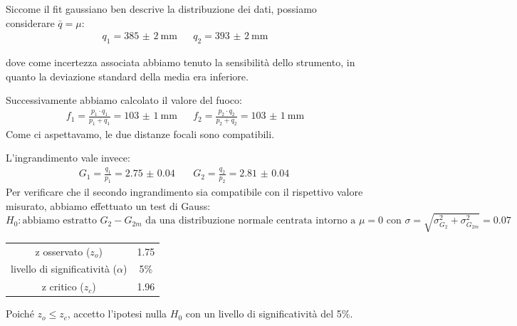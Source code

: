 \documentclass[a4paper]{article}
\begin{document}
    Siccome il fit gaussiano ben descrive la distribuzione dei dati, possiamo considerare $\bar{q} = \mu$:
    \begin{align*}
    	q_1 = \SI{385(2)}{\mm} && q_2 = \SI{393(2)}{\mm}
    \end{align*}
    
    dove come incertezza associata abbiamo tenuto la sensibilità dello strumento, in quanto la deviazione standard della media era inferiore.
    
    Successivamente abbiamo calcolato il valore del fuoco:
    \begin{align*}
    	f_1=\frac{p_1\cdot q_1}{p_1+q_1}=\SI{103(1)}{\mm} && f_2=\frac{p_2\cdot q_2}{p_2+q_2}=\SI{103(1)}{\mm}
    \end{align*}
    Come ci aspettavamo, le due distanze focali sono compatibili.
    
    L'ingrandimento vale invece:
    \begin{align*}
    	G_1=\frac{q_1}{p_1}=\SI{2.75(4)}{} && G_2=\frac{q_2}{p_2}=\SI{2.81(4)}{}
    \end{align*}
    Per verificare che il secondo ingrandimento sia compatibile con il rispettivo valore misurato, abbiamo effettuato un test di Gauss:
    \[
    H_0: \text{abbiamo estratto $G_2-G_{2m}$ da una distribuzione normale centrata intorno a $\mu=0$ con $\sigma=\sqrt{\sigma_{G_2}^2+\sigma_{G_{2m}}^2}=0.07$}
    \]
    \begin{table}[H]
    	\centering
    	\begin{tabular}{|c|c|}
    		\hline
    		z osservato ($z_o$) & 1.75 \\
    		livello di significatività ($\alpha$) & 5\% \\
    		z critico ($z_c$) & 1.96 \\ \hline
    	\end{tabular}
    	\label{tab:gauss-ingrandimento}
    \end{table}
    Poiché $z_o\leq z_c$, accetto l'ipotesi nulla $H_0$ con un livello di significatività del 5\%.
\end{document}
